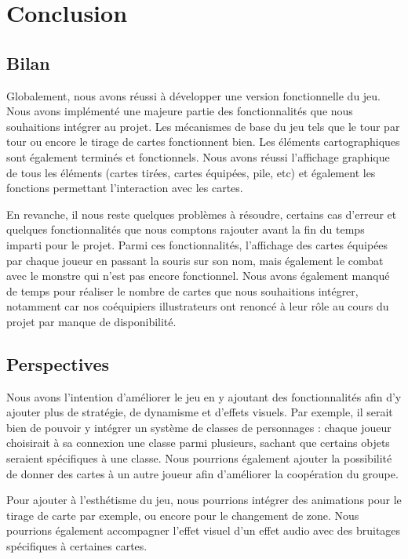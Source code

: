 \documentclass[12pt]{report}
\begin{document}
\chapter*{Conclusion}

  \section*{Bilan}
  Globalement, nous avons réussi à développer une version fonctionnelle du jeu. Nous avons implémenté une majeure partie des fonctionnalités que nous souhaitions intégrer au projet. Les mécanismes de base du jeu tels que le tour par tour ou encore le tirage de cartes fonctionnent bien. Les éléments cartographiques sont également terminés et fonctionnels. Nous avons réussi l'affichage graphique de tous les éléments (cartes tirées, cartes équipées, pile, etc) et également les fonctions permettant l'interaction avec les cartes.

  En revanche, il nous reste quelques problèmes à résoudre, certains cas d'erreur et quelques fonctionnalités que nous comptons rajouter avant la fin du temps imparti pour le projet. Parmi ces fonctionnalités, l'affichage des cartes équipées par chaque joueur en passant la souris sur son nom, mais également le combat avec le monstre qui n'est pas encore fonctionnel. Nous avons également manqué de temps pour réaliser le nombre de cartes que nous souhaitions intégrer, notamment car nos coéquipiers illustrateurs ont renoncé à leur rôle au cours du projet par manque de disponibilité.

  \section*{Perspectives}
	Nous avons l'intention d'améliorer le jeu en y ajoutant des fonctionnalités afin d'y ajouter plus de stratégie, de dynamisme et d'effets visuels. Par exemple, il serait bien de pouvoir y intégrer un système de classes de personnages : chaque joueur choisirait à sa connexion une classe parmi plusieurs, sachant que certains objets seraient spécifiques à une classe. Nous pourrions également ajouter la possibilité de donner des cartes à un autre joueur afin d'améliorer la coopération du groupe.

  Pour ajouter à l'esthétisme du jeu, nous pourrions intégrer des animations pour le tirage de carte par exemple, ou encore pour le changement de zone. Nous pourrions également accompagner l'effet visuel d'un effet audio avec des bruitages spécifiques à certaines cartes.
\end{document}
